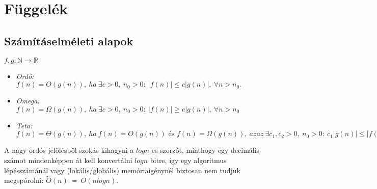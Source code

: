 \appendix
\chapter*{\texorpdfstring{\protect\hypertarget{appendix}{Függelék}}{}}
\setcounter{chapter}{6}  %
\setcounter{equation}{0} %


  \section{Számításelméleti alapok}
  \begin{definition} 
    $f,g: \mathbb{N} \rightarrow \mathbb{R}$
    \begin{itemize}
    \item \emph{ Ordó:} $f(n)=O(g(n)),~ha~ \exists c > 0,~n_{0} > 0:~|f(n)| \leq c|g(n)|,~\forall n>n_{0}.$
    \item \emph{ Omega:} $f(n)=\Omega(g(n)),~ha~ \exists c > 0,~n_{0} > 0:~|f(n)| \geq c|g(n)|,~\forall n>n_{0}$
    \item \emph{ Teta:} $f(n)=\Theta(g(n)),~ha~ f(n)=O(g(n)) \text{ és } f(n)=\Omega(g(n)),~azaz~ \exists c_{1},c_{2} > 0,~n_{0} > 0:~c_{1}|g(n)| \leq |f(n)| \leq c_{2}|g(n)|,~\forall n>n_{0}$
    \end{itemize}
  \end{definition}

  \begin{note}
    A nagy ordós jelölésből szokás kihagyni a $logn$-es szorzót, minthogy egy decimális számot mindenképpen át kell konvertálni $logn$ bitre, így egy algoritmus lépésszámánál vagy (lokális/globális) memóriaigénynél biztosan nem tudjuk megspórolni: $\tilde{O}(n)~=~O(nlogn)$.
  \end{note}

